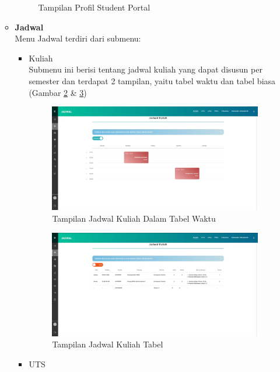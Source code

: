 \begin{enumerate}
\begin{itemize}
\begin{figure}[H]
		\caption{Tampilan Profil Student Portal}
		\label{fig:studentportal_profil}
		\end{figure}
		\item \textbf{Jadwal} \\
		Menu Jadwal terdiri dari submenu:
		\begin{itemize}
			\item Kuliah \\
			Submenu ini berisi tentang jadwal kuliah yang dapat disusun per semester dan terdapat 2 tampilan, yaitu tabel waktu dan tabel biasa (Gambar \ref{fig:studentportal_jadwal_kuliah_timetable} \& \ref{fig:studentportal_jadwal_kuliah_table})
			\begin{figure}[H]
			\centering
			\includegraphics[scale=0.3]{Gambar/studentportal_jadwal_kuliah}
			\caption{Tampilan Jadwal Kuliah Dalam Tabel Waktu}
			\label{fig:studentportal_jadwal_kuliah_timetable}
			\end{figure}
			\begin{figure}[H]
			\centering
			\includegraphics[scale=0.3]{Gambar/studentportal_jadwal_kuliah_table}
			\caption{Tampilan Jadwal Kuliah Tabel}
			\label{fig:studentportal_jadwal_kuliah_table}
			\end{figure}
			\item UTS \\

\end{itemize}
\end{itemize}
\end{enumerate}
